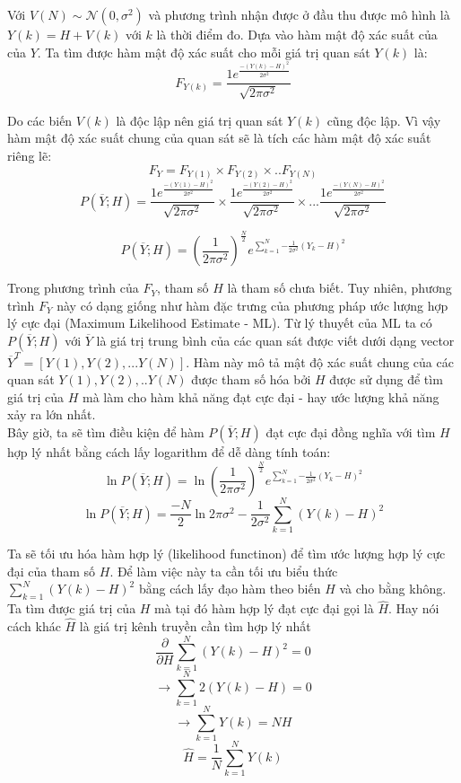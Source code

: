 \documentclass{article}
\begin{document}
Với $V(N) \sim \mathcal{N}(0,\sigma^2)$ và phương trình nhận được ở đầu thu được mô hình là $Y(k) = H + V(k)$ với $k$ là thời điểm đo. Dựa vào hàm mật độ xác suất của của $Y$. Ta tìm được hàm mật độ xác suất cho mỗi giá trị quan sát $Y(k)$ là:
$$F_{Y(k)} = \frac{1 e^{\frac{-(Y(k)-H)^2}{2\sigma^2}}}{\sqrt{2\pi\sigma^2}}$$

Do các biến $V(k)$ là độc lập nên giá trị quan sát $Y(k)$ cũng độc lập. Vì vậy hàm mật độ xác suất chung của quan sát sẽ là tích các hàm mật độ xác suất riêng lẽ:
$$F_{Y} = F_{Y(1)}\times F_{Y(2)}\times..F_{Y(N)}$$
$$P(\overline{Y}; H) = \frac{1 e^{\frac{-(Y(1)-H)^2}{2\sigma^2}}}{\sqrt{2\pi\sigma^2}} \times \frac{1 e^{\frac{-(Y(2)-H)^2}{2\sigma^2}}}{\sqrt{2\pi\sigma^2}} \times... \frac{1 e^{\frac{-(Y(N)-H)^2}{2\sigma^2}}}{\sqrt{2\pi\sigma^2}}$$


$$P(\overline{Y}; H)= {(\frac{1}{2 \pi \sigma^2})}^{\frac{N}{2}} e^{\sum_{k=1}^{N}{-\frac{1}{2 \sigma^2} (Y_k - H)^2}} $$

Trong phương trình của $F_Y$, tham số $H$ là tham số chưa biết. Tuy nhiên, phương trình $F_Y$ này có dạng giống như hàm đặc trưng của phương pháp ước lượng hợp lý cực đại (Maximum Likelihood Estimate - ML). Từ lý thuyết của ML ta có $ P(\overline{Y}; H)$ với $\overline{Y}$ là giá trị trung bình của các quan sát được viết dưới dạng vector $\overline{Y}^T = [Y(1), Y(2),...Y(N)]$. Hàm này mô tả mật độ xác suất chung của các quan sát $Y(1), Y(2),..Y(N)$ được tham số hóa bởi $H$ được sử dụng để tìm giá trị của $H$ mà làm cho hàm khả năng đạt cực đại - hay ước lượng khả năng xảy ra lớn nhất.\\

Bây giờ, ta sẽ tìm điều kiện để hàm $ P(\overline{Y}; H)$ đạt cực đại đồng nghĩa với tìm $H$ hợp lý nhất bằng cách lấy logarithm để dễ dàng tính toán:
$$\ln P(\overline{Y}; H) = \ln {(\frac{1}{2 \pi \sigma^2})}^{\frac{N}{2}} e^{\sum_{k=1}^{N}{-\frac{1}{2 \sigma^2} (Y_k - H)^2}} $$
$$\ln P(\overline{Y}; H) =\frac{-N}{2} \ln2\pi\sigma^2 - \frac{1}{2\sigma^2} \sum_{k=1}^{N}(Y(k)-H)^2$$

Ta sẽ tối ưu hóa hàm hợp lý (likelihood functinon) để tìm ước lượng hợp lý cực đại của tham số $H$. Để làm việc này ta cần tối ưu biểu thức $\sum_{k=1}^{N}(Y(k)-H)^2$ bằng cách lấy đạo hàm theo biến $H$ và cho bằng không. Ta tìm được giá trị của $H$ mà tại đó hàm hợp lý đạt cực đại gọi là $\hat{H}$. Hay nói cách khác $\hat{H}$ là giá trị kênh truyền cần tìm hợp lý nhất\\
$$\frac{\partial}{\partial H} \sum_{k=1}^{N}(Y(k)-H)^2 = 0$$
$$ \rightarrow \sum_{k=1}^{N}2(Y(k)-H) = 0$$ 
$$ \rightarrow \sum_{k=1}^{N}Y(k) = NH$$
$$ \hat{H} = \frac{1}{N}\sum_{k=1}^{N}Y(k) $$
\end{document}

